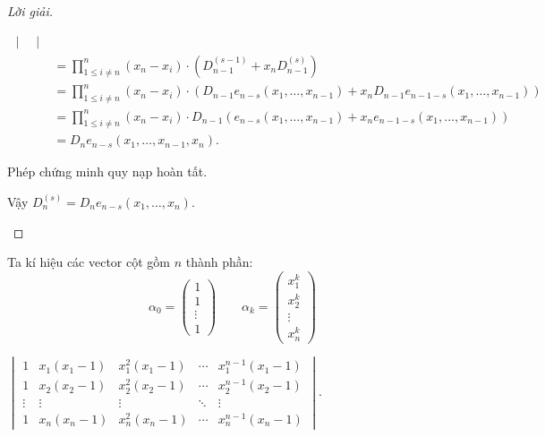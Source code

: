 \begin{proof}[Lời giải]
\begin{enumerate}[label = (\alph*)]
\begin{align*}
\begin{vmatrix}
                       \end{vmatrix}                                                                  \\
                   & = \prod^{n}_{1\le i\ne n}(x_{n} - x_{i})\cdot \left(D^{(s-1)}_{n-1} + x_{n}D^{(s)}_{n-1}\right)                                                     \\
                   & = \prod^{n}_{1\le i\ne n}(x_{n} - x_{i})\cdot \left( D_{n-1}e_{n-s}(x_{1}, \ldots, x_{n-1}) + x_{n}D_{n-1}e_{n-1-s}(x_{1}, \ldots, x_{n-1}) \right) \\
                   & = \prod^{n}_{1\le i\ne n}(x_{n} - x_{i})\cdot D_{n-1} \left( e_{n-s}(x_{1}, \ldots, x_{n-1}) + x_{n}e_{n-1-s}(x_{1}, \ldots, x_{n-1}) \right)       \\
                   & = D_{n} e_{n-s}(x_{1}, \ldots, x_{n-1}, x_{n}).
              \end{align*}
              
              Phép chứng minh quy nạp hoàn tất.
              
              Vậy $D^{(s)}_{n} = D_{n}e_{n-s}(x_{1}, \ldots, x_{n})$.
    \end{enumerate}
\end{proof}

Ta kí hiệu các vector cột gồm $n$ thành phần:
\[
    \alpha_{0} = \begin{pmatrix}
        1 \\ 1 \\ \vdots \\ 1
    \end{pmatrix}\qquad
    \alpha_{k} = \begin{pmatrix}
        x_{1}^{k} \\ x_{2}^{k} \\ \vdots \\ x_{n}^{k}
    \end{pmatrix}
\]

\begin{exercise}
    $\begin{vmatrix}
            1      & x_{1}(x_{1} - 1) & x_{1}^{2}(x_{1} - 1) & \cdots & x_{1}^{n-1}(x_{1} - 1) \\
            1      & x_{2}(x_{2} - 1) & x_{2}^{2}(x_{2} - 1) & \cdots & x_{2}^{n-1}(x_{2} - 1) \\
            \vdots & \vdots           & \vdots               & \ddots & \vdots                 \\
            1      & x_{n}(x_{n} - 1) & x_{n}^{2}(x_{n} - 1) & \cdots & x_{n}^{n-1}(x_{n} - 1)
        \end{vmatrix}$.
\end{exercise}

